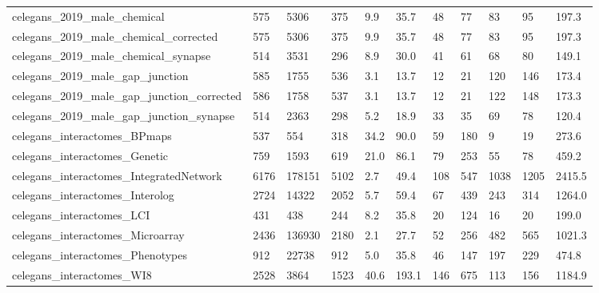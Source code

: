 \begin{longtable}{lllllllllll}
 celegans\_2019\_male\_chemical                        & 575        & 5306      & 375   & 9.9    & 35.7   & 48    & 77     & 83     & 95     & 197.3   \\
 celegans\_2019\_male\_chemical\_corrected              & 575        & 5306      & 375   & 9.9    & 35.7   & 48    & 77     & 83     & 95     & 197.3   \\
 celegans\_2019\_male\_chemical\_synapse                & 514        & 3531      & 296   & 8.9    & 30.0   & 41    & 61     & 68     & 80     & 149.1   \\
 celegans\_2019\_male\_gap\_junction                    & 585        & 1755      & 536   & 3.1    & 13.7   & 12    & 21     & 120    & 146    & 173.4   \\
 celegans\_2019\_male\_gap\_junction\_corrected          & 586        & 1758      & 537   & 3.1    & 13.7   & 12    & 21     & 122    & 148    & 173.3   \\
 celegans\_2019\_male\_gap\_junction\_synapse            & 514        & 2363      & 298   & 5.2    & 18.9   & 33    & 35     & 69     & 78     & 120.4   \\
 celegans\_interactomes\_BPmaps                       & 537        & 554       & 318   & 34.2   & 90.0   & 59    & 180    & 9      & 19     & 273.6   \\
 celegans\_interactomes\_Genetic                      & 759        & 1593      & 619   & 21.0   & 86.1   & 79    & 253    & 55     & 78     & 459.2   \\
 celegans\_interactomes\_IntegratedNetwork            & 6176       & 178151    & 5102  & 2.7    & 49.4   & 108   & 547    & 1038   & 1205   & 2415.5  \\
 celegans\_interactomes\_Interolog                    & 2724       & 14322     & 2052  & 5.7    & 59.4   & 67    & 439    & 243    & 314    & 1264.0  \\
 celegans\_interactomes\_LCI                          & 431        & 438       & 244   & 8.2    & 35.8   & 20    & 124    & 16     & 20     & 199.0   \\
 celegans\_interactomes\_Microarray                   & 2436       & 136930    & 2180  & 2.1    & 27.7   & 52    & 256    & 482    & 565    & 1021.3  \\
 celegans\_interactomes\_Phenotypes                   & 912        & 22738     & 912   & 5.0    & 35.8   & 46    & 147    & 197    & 229    & 474.8   \\
 celegans\_interactomes\_WI8                          & 2528       & 3864      & 1523  & 40.6   & 193.1  & 146   & 675    & 113    & 156    & 1184.9  \\

\end{longtable}
